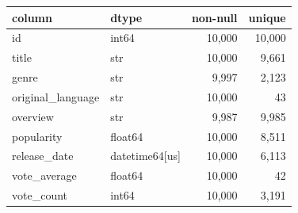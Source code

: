 \begin{tabular}{llrr}
\toprule
column & dtype & non-null & unique \\
\midrule
id & int64 & 10{,}000 & 10{,}000 \\
title & str & 10{,}000 & 9{,}661 \\
genre & str & 9{,}997 & 2{,}123 \\
original\_language & str & 10{,}000 & 43 \\
overview & str & 9{,}987 & 9{,}985 \\
popularity & float64 & 10{,}000 & 8{,}511 \\
release\_date & datetime64[us] & 10{,}000 & 6{,}113 \\
vote\_average & float64 & 10{,}000 & 42 \\
vote\_count & int64 & 10{,}000 & 3{,}191 \\
\bottomrule
\end{tabular}
